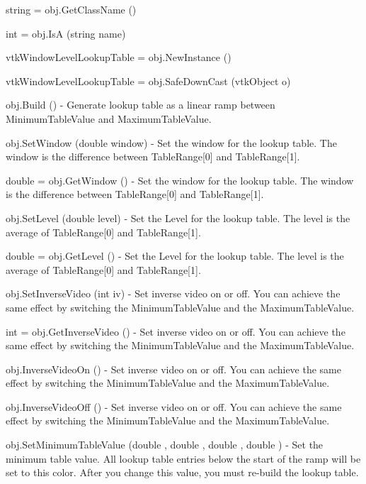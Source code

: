 \begin{DoxyItemize}
\item {\ttfamily string = obj.\-Get\-Class\-Name ()}  
\item {\ttfamily int = obj.\-Is\-A (string name)}  
\item {\ttfamily vtk\-Window\-Level\-Lookup\-Table = obj.\-New\-Instance ()}  
\item {\ttfamily vtk\-Window\-Level\-Lookup\-Table = obj.\-Safe\-Down\-Cast (vtk\-Object o)}  
\item {\ttfamily obj.\-Build ()} -\/ Generate lookup table as a linear ramp between Minimum\-Table\-Value and Maximum\-Table\-Value.  
\item {\ttfamily obj.\-Set\-Window (double window)} -\/ Set the window for the lookup table. The window is the difference between Table\-Range\mbox{[}0\mbox{]} and Table\-Range\mbox{[}1\mbox{]}.  
\item {\ttfamily double = obj.\-Get\-Window ()} -\/ Set the window for the lookup table. The window is the difference between Table\-Range\mbox{[}0\mbox{]} and Table\-Range\mbox{[}1\mbox{]}.  
\item {\ttfamily obj.\-Set\-Level (double level)} -\/ Set the Level for the lookup table. The level is the average of Table\-Range\mbox{[}0\mbox{]} and Table\-Range\mbox{[}1\mbox{]}.  
\item {\ttfamily double = obj.\-Get\-Level ()} -\/ Set the Level for the lookup table. The level is the average of Table\-Range\mbox{[}0\mbox{]} and Table\-Range\mbox{[}1\mbox{]}.  
\item {\ttfamily obj.\-Set\-Inverse\-Video (int iv)} -\/ Set inverse video on or off. You can achieve the same effect by switching the Minimum\-Table\-Value and the Maximum\-Table\-Value.  
\item {\ttfamily int = obj.\-Get\-Inverse\-Video ()} -\/ Set inverse video on or off. You can achieve the same effect by switching the Minimum\-Table\-Value and the Maximum\-Table\-Value.  
\item {\ttfamily obj.\-Inverse\-Video\-On ()} -\/ Set inverse video on or off. You can achieve the same effect by switching the Minimum\-Table\-Value and the Maximum\-Table\-Value.  
\item {\ttfamily obj.\-Inverse\-Video\-Off ()} -\/ Set inverse video on or off. You can achieve the same effect by switching the Minimum\-Table\-Value and the Maximum\-Table\-Value.  
\item {\ttfamily obj.\-Set\-Minimum\-Table\-Value (double , double , double , double )} -\/ Set the minimum table value. All lookup table entries below the start of the ramp will be set to this color. After you change this value, you must re-\/build the lookup table.  

\end{DoxyItemize}
